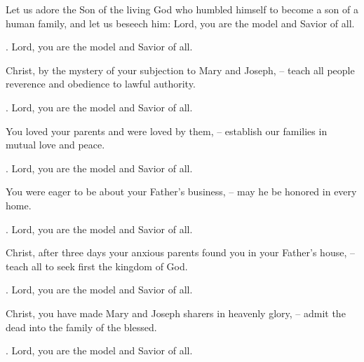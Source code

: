 \lettrine[loversize=0.15,lines=2]{L}{}et us adore the Son of the living God who humbled himself to become a son of a human family, and let us beseech him:
Lord, you are the model and Savior of all.
\par \Rbar. Lord, you are the model and Savior of all.

Christ, by the mystery of your subjection to Mary and Joseph,
– teach all people reverence and obedience to lawful authority.
\par \Rbar. Lord, you are the model and Savior of all.

You loved your parents and were loved by them,
– establish our families in mutual love and peace.
\par \Rbar. Lord, you are the model and Savior of all.

You were eager to be about your Father’s business,
– may he be honored in every home.
\par \Rbar. Lord, you are the model and Savior of all.

Christ, after three days your anxious parents found you in your Father’s house,
– teach all to seek first the kingdom of God.
\par \Rbar. Lord, you are the model and Savior of all.

Christ, you have made Mary and Joseph sharers in heavenly glory,
– admit the dead into the family of the blessed.
\par \Rbar. Lord, you are the model and Savior of all.